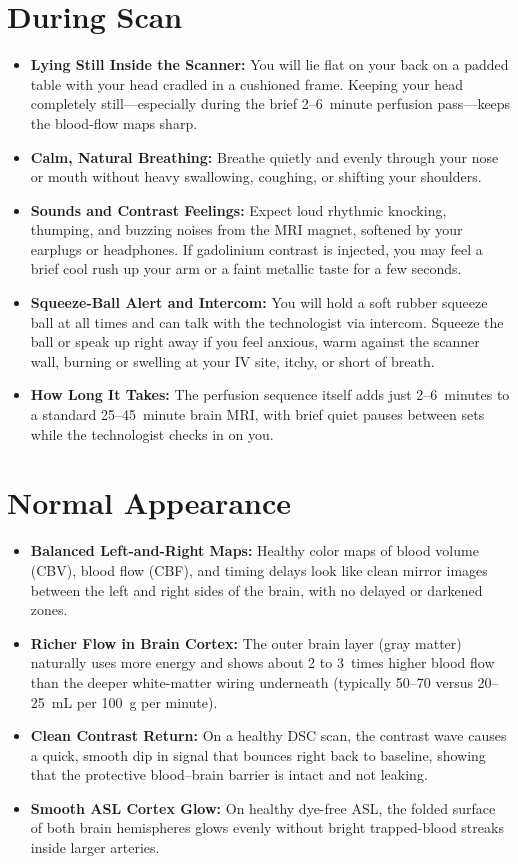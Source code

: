\section{During Scan}

\begin{itemize}
    \item \textbf{Lying Still Inside the Scanner:} You will lie flat on your back on a padded table with your head cradled in a cushioned frame. Keeping your head completely still---especially during the brief 2--6~minute perfusion pass---keeps the blood-flow maps sharp.
    \item \textbf{Calm, Natural Breathing:} Breathe quietly and evenly through your nose or mouth without heavy swallowing, coughing, or shifting your shoulders.
    \item \textbf{Sounds and Contrast Feelings:} Expect loud rhythmic knocking, thumping, and buzzing noises from the MRI magnet, softened by your earplugs or headphones. If gadolinium contrast is injected, you may feel a brief cool rush up your arm or a faint metallic taste for a few seconds.
    \item \textbf{Squeeze-Ball Alert and Intercom:} You will hold a soft rubber squeeze ball at all times and can talk with the technologist via intercom. Squeeze the ball or speak up right away if you feel anxious, warm against the scanner wall, burning or swelling at your IV site, itchy, or short of breath.
    \item \textbf{How Long It Takes:} The perfusion sequence itself adds just 2--6~minutes to a standard 25--45~minute brain MRI, with brief quiet pauses between sets while the technologist checks in on you.
\end{itemize}

\section{Normal Appearance}

\begin{itemize}
    \item \textbf{Balanced Left-and-Right Maps:} Healthy color maps of blood volume (CBV), blood flow (CBF), and timing delays look like clean mirror images between the left and right sides of the brain, with no delayed or darkened zones.
    \item \textbf{Richer Flow in Brain Cortex:} The outer brain layer (gray matter) naturally uses more energy and shows about 2 to 3~times higher blood flow than the deeper white-matter wiring underneath (typically 50--70 versus 20--25~mL per 100~g per minute).
    \item \textbf{Clean Contrast Return:} On a healthy DSC scan, the contrast wave causes a quick, smooth dip in signal that bounces right back to baseline, showing that the protective blood--brain barrier is intact and not leaking.
    \item \textbf{Smooth ASL Cortex Glow:} On healthy dye-free ASL, the folded surface of both brain hemispheres glows evenly without bright trapped-blood streaks inside larger arteries.
\end{itemize}

